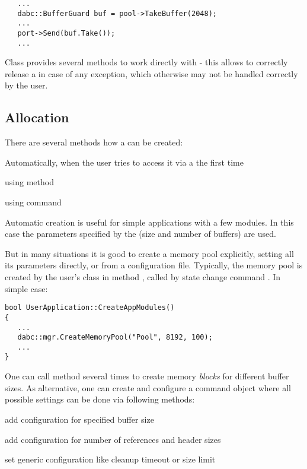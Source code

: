 \begin{small}
\begin{verbatim}     
   ...
   dabc::BufferGuard buf = pool->TakeBuffer(2048);
   ...
   port->Send(buf.Take());
   ...
\end{verbatim}     
\end{small}

Class  provides several methods to work directly 
with  - this allows to correctly release a 
in case of any exception, which otherwise may not be handled correctly by the user.  


\subsection{Allocation}
\label{prog_services_memory_allocation}
There are several methods how a  can be created:
\bbul
\item Automatically, when the user  tries to access it via a 
 the first time

\item using  method

\item using  command
\ebul

Automatic creation is useful for simple applications with a few modules.
In this case the parameters specified by the 
 (size and number of buffers) are used. 

But in many situations it is good to create a memory pool explicitly,
setting all its parameters directly, or from a  configuration file.
Typically, the memory pool is created by the user's  class in 
method , called by state change command .
In simple case:

\begin{small}
\begin{verbatim}     
bool UserApplication::CreateAppModules()
{
   ...
   dabc::mgr.CreateMemoryPool("Pool", 8192, 100);
   ...
}
\end{verbatim}     
\end{small}

One can call  method several times to create 
memory {\em blocks} for different buffer sizes. As alternative, one can create and 
configure a command object  
where all possible settings can be done via following methods:
\bbul
\item[\func{AddMem()}] add configuration for specified buffer size 
\item[\func{AddRef()}] add configuration for number of references and header sizes 
\item[\func{AddCfg()}] set generic configuration like cleanup timeout or size limit 
\ebul

